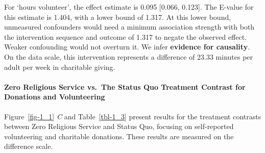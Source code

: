 \documentclass[
  single column]{article}
\let\oldparagraph\paragraph
\renewcommand{\paragraph}[1]{\oldparagraph{#1}\mbox{}}
\begin{document}
For `hours volunteer', the effect estimate is 0.095 {[}0.066, 0.123{]}.
The E-value for this estimate is 1.404, with a lower bound of 1.317. At
this lower bound, unmeasured confounders would need a minimum
association strength with both the intervention sequence and outcome of
1.317 to negate the observed effect. Weaker confounding would not
overturn it. We infer \textbf{evidence for causality}. On the data
scale, this intervention represents a difference of 23.33 minutes per
adult per week in charitable giving.

\paragraph{Zero Religious Service vs.~The Status Quo Treatment Contrast
for Donations and
Volunteering}\label{zero-religious-service-vs.-the-status-quo-treatment-contrast-for-donations-and-volunteering}

Figure~\ref{fig-1_1} \emph{C} and Table~\ref{tbl-1_3} present results
for the treatment contrasts between Zero Religious Service and Status
Quo, focusing on self-reported volunteering and charitable donations.
These results are measured on the difference scale.
\end{document}
